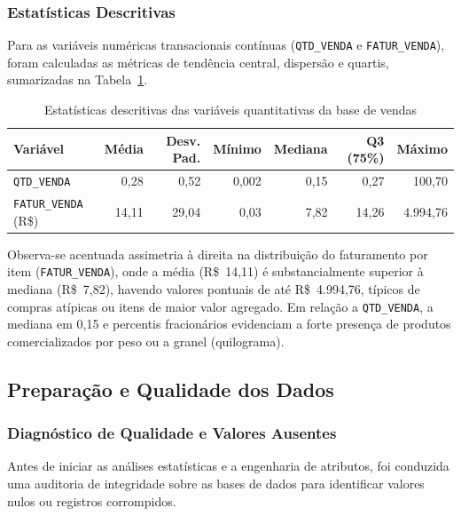 \subsubsection{Estatísticas Descritivas}
Para as variáveis numéricas transacionais contínuas (\texttt{QTD\_VENDA} e \texttt{FATUR\_VENDA}), foram calculadas as métricas de tendência central, dispersão e quartis, sumarizadas na Tabela~\ref{tab:estatisticas_descritivas}.

\begin{table}[H]
\centering
\caption{Estatísticas descritivas das variáveis quantitativas da base de vendas}
\label{tab:estatisticas_descritivas}
\begin{tabular}{lrrrrrr}
\toprule
\textbf{Variável} & \textbf{Média} & \textbf{Desv. Pad.} & \textbf{Mínimo} & \textbf{Mediana} & \textbf{Q3 (75\%)} & \textbf{Máximo} \\
\midrule
\texttt{QTD\_VENDA}        & 0,28  & 0,52  & 0,002 & 0,15 & 0,27  & 100,70 \\
\texttt{FATUR\_VENDA} (R\$) & 14,11 & 29,04 & 0,03  & 7,82 & 14,26 & 4.994,76 \\
\bottomrule
\end{tabular}
\end{table}

Observa-se acentuada assimetria à direita na distribuição do faturamento por item (\texttt{FATUR\_VENDA}), onde a média (R\$~14,11) é substancialmente superior à mediana (R\$~7,82), havendo valores pontuais de até R\$~4.994,76, típicos de compras atípicas ou itens de maior valor agregado. Em relação a \texttt{QTD\_VENDA}, a mediana em 0,15 e percentis fracionários evidenciam a forte presença de produtos comercializados por peso ou a granel (quilograma).
\subsection{Preparação e Qualidade dos Dados}\label{subsec:preparacao}

\subsubsection{Diagnóstico de Qualidade e Valores Ausentes}
Antes de iniciar as análises estatísticas e a engenharia de atributos, foi conduzida uma auditoria de integridade sobre as bases de dados para identificar valores nulos ou registros corrompidos.

